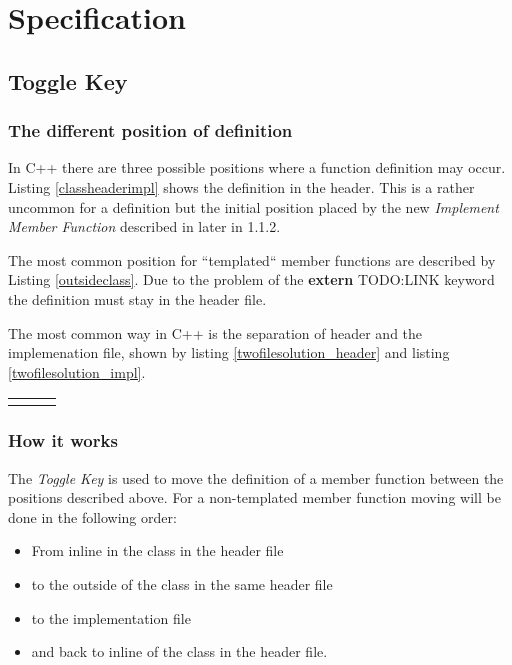 \chapter{Specification}
\thispagestyle{fancy}

\section{Toggle Key}

\subsection{The different position of definition}

In C++ there are three possible positions where a  function definition may occur. Listing \ref{classheaderimpl} shows
the definition in the header. This is a rather uncommon for a definition but the
initial position placed by the new \textit{Implement Member Function} described
in later in 1.1.2.


The most common position for ``templated`` member functions are described by
Listing \ref{outsideclass}. Due to the problem of the \textbf{extern} TODO:LINK
keyword the definition must stay in the header file.


The most common way in C++ is the separation of header and the implemenation
file, shown by listing \ref{twofilesolution_header} and listing
\ref{twofilesolution_impl}.

\begin{tabular}{p{5cm}p{.5cm}p{6cm}}

& & 

\end{tabular}

\subsection{How it works}

The \textit{Toggle Key} is used to move the definition of a member function
between the positions described above. For a non-templated member function
moving will be done in the following order:
\begin{itemize}
 \item From inline in the class in the header file
 \item to the outside of the class in the same header file
 \item to the implementation file
 \item and back to inline of the class in the header file.
\end{itemize}

